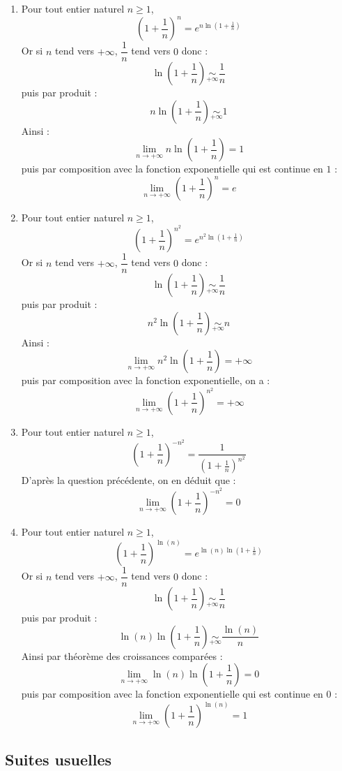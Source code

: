\documentclass[a4paper,twoside,french,10pt]{VcCours}
\begin{document}
\begin{enumerate}
\item Pour tout entier naturel $n \geq 1$,
$$ \left( 1 + \frac{1}{n} \right)^n = e^{n \ln \left(1 + \frac{1}{n} \right)}$$
Or si $n$ tend vers $+ \infty$, $\dfrac{1}{n}$ tend vers $0$ donc :
$$  \ln \left(1 + \frac{1}{n} \right) \underset{ + \infty}{\sim} \frac{1}{n}$$
puis par produit :
$$ n \ln \left(1 + \frac{1}{n} \right) \underset{ + \infty}{\sim} 1$$
Ainsi :
$$ \lim_{n \rightarrow + \infty} n \ln \left(1 + \frac{1}{n} \right) = 1$$
puis par composition avec la fonction exponentielle qui est continue en $1$ : 
$$ \lim_{n \rightarrow + \infty} \left( 1 + \frac{1}{n} \right)^n = e$$
\item Pour tout entier naturel $n \geq 1$,
$$ \left( 1 + \frac{1}{n} \right)^{n^2} = e^{n^2 \ln \left(1 + \frac{1}{n} \right)}$$
Or si $n$ tend vers $+ \infty$, $\dfrac{1}{n}$ tend vers $0$ donc :
$$  \ln \left(1 + \frac{1}{n} \right) \underset{ + \infty}{\sim} \frac{1}{n}$$
puis par produit :
$$ n^2 \ln \left(1 + \frac{1}{n} \right) \underset{ + \infty}{\sim} n$$
Ainsi :
$$ \lim_{n \rightarrow + \infty} n^2 \ln \left(1 + \frac{1}{n} \right) = + \infty$$
puis par composition avec la fonction exponentielle, on a :
$$ \lim_{n \rightarrow + \infty} \left( 1 + \frac{1}{n} \right)^{n^2} = + \infty$$
\item Pour tout entier naturel $n \geq 1$,
$$ \left(1+ \frac{1}{n}\right)^{-n^2} = \dfrac{1}{\left(1+ \frac{1}{n}\right)^{n^2}}$$
D'après la question précédente, on en déduit que :
$$ \lim_{n \rightarrow + \infty} \left(1+ \frac{1}{n}\right)^{-n^2} = 0$$
\item Pour tout entier naturel $n \geq 1$,
$$ \left( 1 + \frac{1}{n} \right)^{\ln(n)} = e^{\ln(n) \ln \left(1 + \frac{1}{n} \right)}$$
Or si $n$ tend vers $+ \infty$, $\dfrac{1}{n}$ tend vers $0$ donc :
$$  \ln \left(1 + \frac{1}{n} \right) \underset{ + \infty}{\sim} \frac{1}{n}$$
puis par produit :
$$ \ln(n) \ln \left(1 + \frac{1}{n} \right) \underset{ + \infty}{\sim} \dfrac{\ln(n)}{n}$$
Ainsi par théorème des croissances comparées :
$$ \lim_{n \rightarrow + \infty} \ln(n) \ln \left(1 + \frac{1}{n} \right) = 0$$
puis par composition avec la fonction exponentielle qui est continue en $0$ : 
$$ \lim_{n \rightarrow + \infty} \left( 1 + \frac{1}{n} \right)^{\ln(n)} = 1$$
\end{enumerate}

\medskip

\subsection{Suites usuelles}
\end{document}
